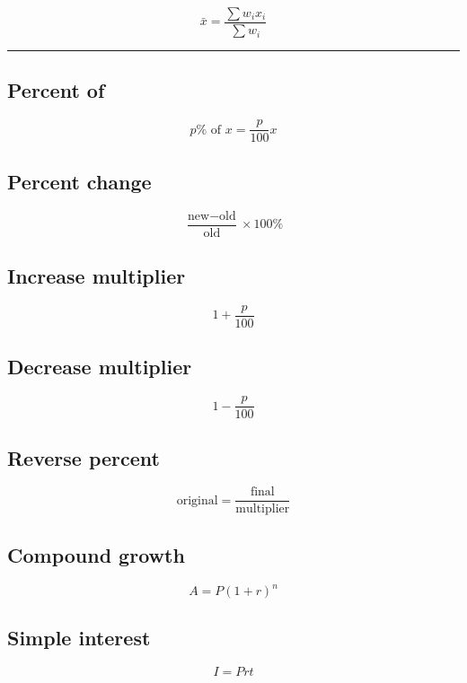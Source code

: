 \documentclass[
]{article}
\begin{document}
\[
\boxed{
\bar x=
\frac{\sum w_ix_i}{\sum w_i}
}
\]

\begin{center}\rule{0.5\linewidth}{0.5pt}\end{center}

\subsection{Percent of}\label{percent-of}

\[
\boxed{p\%\text{ of }x=\frac p{100}x}
\]

\subsection{Percent change}\label{percent-change-1}

\[
\boxed{
\frac{\text{new}-\text{old}}
{\text{old}}\times100\%
}
\]

\subsection{Increase multiplier}\label{increase-multiplier}

\[
\boxed{1+\frac p{100}}
\]

\subsection{Decrease multiplier}\label{decrease-multiplier}

\[
\boxed{1-\frac p{100}}
\]

\subsection{Reverse percent}\label{reverse-percent}

\[
\boxed{
\text{original}
=
\frac{\text{final}}
{\text{multiplier}}
}
\]

\subsection{Compound growth}\label{compound-growth-1}

\[
\boxed{A=P(1+r)^n}
\]

\subsection{Simple interest}\label{simple-interest-1}

\[
\boxed{I=Prt}
\]
\end{document}
